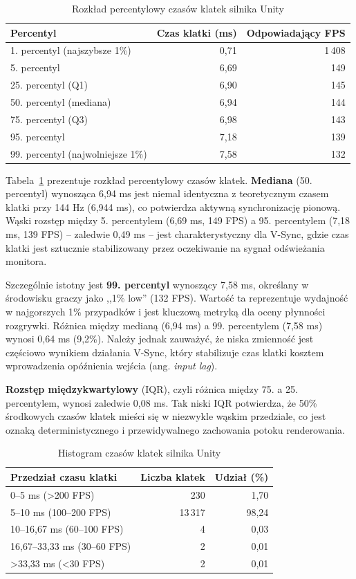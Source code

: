 \begin{table}[H]
\centering
\caption{Rozkład percentylowy czasów klatek silnika Unity}
\label{tab:unity-percentiles}
\begin{tabular}{|l|r|r|}
\hline
\textbf{Percentyl} & \textbf{Czas klatki (ms)} & \textbf{Odpowiadający FPS} \\
\hline
1. percentyl (najszybsze 1\%) & 0,71 & 1\,408 \\
5. percentyl & 6,69 & 149 \\
25. percentyl (Q1) & 6,90 & 145 \\
50. percentyl (mediana) & 6,94 & 144 \\
75. percentyl (Q3) & 6,98 & 143 \\
95. percentyl & 7,18 & 139 \\
99. percentyl (najwolniejsze 1\%) & 7,58 & 132 \\
\hline
\end{tabular}
\end{table}

Tabela~\ref{tab:unity-percentiles} prezentuje rozkład percentylowy czasów klatek. \textbf{Mediana} 
(50. percentyl) wynosząca 6,94 ms jest niemal
identyczna z teoretycznym czasem klatki przy 144 Hz (6,944 ms), co potwierdza aktywną 
synchronizację pionową. Wąski rozstęp między 5. percentylem
(6,69 ms, 149 FPS) a 95. percentylem (7,18 ms, 139 FPS) -- zaledwie 0,49 ms -- 
jest charakterystyczny dla V-Sync, gdzie czas klatki jest
sztucznie stabilizowany przez oczekiwanie na sygnał odświeżania monitora.

Szczególnie istotny jest \textbf{99. percentyl} wynoszący 7,58 ms, określany w środowisku graczy 
jako ,,1\% low'' (132 FPS). Wartość ta reprezentuje
wydajność w najgorszych 1\% przypadków i jest kluczową metryką dla oceny płynności rozgrywki. 
Różnica między medianą (6,94 ms) a 99. percentylem
(7,58 ms) wynosi 0,64 ms (9,2\%). Należy jednak zauważyć, że niska zmienność jest częściowo 
wynikiem działania V-Sync, który stabilizuje
czas klatki kosztem wprowadzenia opóźnienia wejścia (ang. \textit{input lag}).

\textbf{Rozstęp międzykwartylowy} (IQR), czyli różnica między 75. a 25. percentylem, wynosi zaledwie 
0,08 ms. Tak niski IQR potwierdza, że 50\% 
środkowych czasów klatek mieści się w niezwykle wąskim przedziale, co jest oznaką deterministycznego i 
przewidywalnego zachowania potoku renderowania.

\begin{table}[H]
\centering
\caption{Histogram czasów klatek silnika Unity}
\label{tab:unity-histogram}
\begin{tabular}{|l|r|r|}
\hline
\textbf{Przedział czasu klatki} & \textbf{Liczba klatek} & \textbf{Udział (\%)} \\
\hline
0--5 ms (>200 FPS) & 230 & 1,70 \\
5--10 ms (100--200 FPS) & 13\,317 & 98,24 \\
10--16,67 ms (60--100 FPS) & 4 & 0,03 \\
16,67--33,33 ms (30--60 FPS) & 2 & 0,01 \\
>33,33 ms (<30 FPS) & 2 & 0,01 \\
\hline
\end{tabular}
\end{table}

